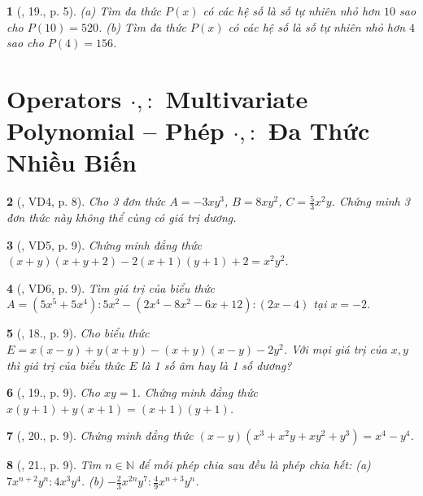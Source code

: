 \documentclass{article}
\newtheorem{baitoan}{}
\begin{document}
\begin{baitoan}[\cite{Binh_Toan_8_tap_1}, 19., p. 5]
	(a) Tìm đa thức $P(x)$ có các hệ số là số tự nhiên nhỏ hơn $10$ sao cho $P(10) = 520$. (b) Tìm đa thức $P(x)$ có các hệ số là số tự nhiên nhỏ hơn $4$ sao cho $P(4) = 156$.
\end{baitoan}


\section{Operators $\cdot,:$ Multivariate Polynomial -- Phép $\cdot,:$ Đa Thức Nhiều Biến}

\begin{baitoan}[\cite{Tuyen_Toan_8}, VD4, p. 8]
	Cho 3 đơn thức $A = -3xy^3$, $B = 8xy^2$, $C = \frac{5}{3}x^2y$. Chứng minh 3 đơn thức này không thể cùng có giá trị dương.
\end{baitoan}

\begin{baitoan}[\cite{Tuyen_Toan_8}, VD5, p. 9]
	Chứng minh đẳng thức $(x + y)(x + y + 2) - 2(x + 1)(y + 1) + 2 = x^2y^2$.
\end{baitoan}

\begin{baitoan}[\cite{Tuyen_Toan_8}, VD6, p. 9]
	Tìm giá trị của biểu thức $A = (5x^5 + 5x^4):5x^2 - (2x^4 - 8x^2 - 6x + 12):(2x - 4)$ tại $x = -2$.
\end{baitoan}

\begin{baitoan}[\cite{Tuyen_Toan_8}, 18., p. 9]
	Cho biểu thức $E = x(x - y) + y(x + y) - (x + y)(x - y) - 2y^2$. Với mọi giá trị của $x,y$ thì giá trị của biểu thức $E$ là 1 số âm hay là 1 số dương?
\end{baitoan}

\begin{baitoan}[\cite{Tuyen_Toan_8}, 19., p. 9]
	Cho $xy = 1$. Chứng minh đẳng thức $x(y + 1) + y(x + 1) = (x + 1)(y + 1)$.
\end{baitoan}

\begin{baitoan}[\cite{Tuyen_Toan_8}, 20., p. 9]
	Chứng minh đẳng thức $(x - y)(x^3 + x^2y + xy^2 + y^3) = x^4 - y^4$.
\end{baitoan}

\begin{baitoan}[\cite{Tuyen_Toan_8}, 21., p. 9]
	Tìm $n\in\mathbb{N}$ để mỗi phép chia sau đều là phép chia hết: (a) $7x^{n+2}y^n:4x^3y^4$. (b) $-\frac{2}{3}x^{2n}y^7:\frac{4}{9}x^{n+3}y^n$.
\end{baitoan}
\end{document}
